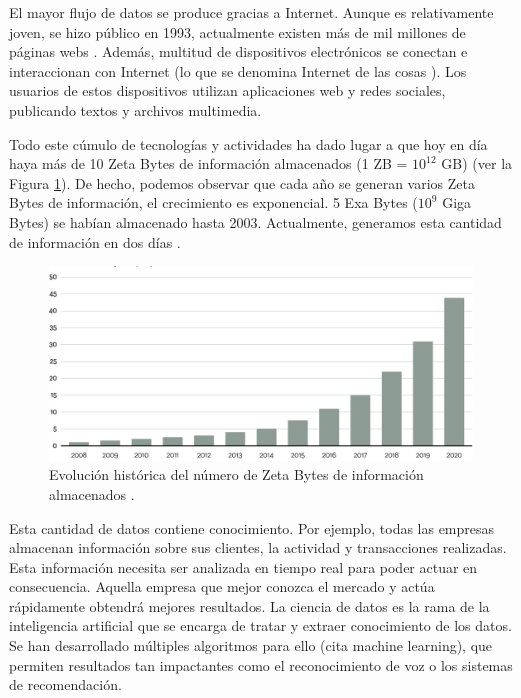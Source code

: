 \documentclass{article}
\begin{document}
	El mayor flujo de datos se produce gracias a Internet. Aunque es relativamente joven, se hizo público en 1993, actualmente existen más de mil millones de páginas webs \cite{internet}. Además, multitud de dispositivos electrónicos se conectan e interaccionan con Internet (lo que se denomina Internet de las cosas \cite{big-data-internet-cosas}). Los usuarios de estos dispositivos utilizan aplicaciones web y redes sociales, publicando textos y archivos multimedia. 
	
	Todo este cúmulo de tecnologías y actividades ha dado lugar a que hoy en día haya más de 10 Zeta Bytes de información almacenados (1 ZB = $10^{12}$ GB) (ver la Figura \ref{fig:zeta-bytes}). De hecho, podemos observar que cada año se generan varios Zeta Bytes de información, el crecimiento es exponencial. 5 Exa Bytes ($10^9$ Giga Bytes) se habían almacenado hasta 2003. Actualmente, generamos esta cantidad de información en dos días \cite{big-data}.
	
	 \begin{figure}[h]
	       	\centering
	       	\includegraphics[width=15cm]{./images/Data.png}
	       	\caption{Evolución histórica del número de Zeta Bytes de información almacenados \cite{zeta-bytes}.} 
	       	\label{fig:zeta-bytes}
	 \end{figure}

	Esta cantidad de datos contiene conocimiento. Por ejemplo, todas las empresas almacenan información sobre sus clientes, la actividad y transacciones realizadas. Esta información necesita ser analizada en tiempo real para poder actuar en consecuencia. Aquella empresa que mejor conozca el mercado y actúa rápidamente obtendrá mejores resultados. La ciencia de datos es la rama de la inteligencia artificial que se encarga de tratar y extraer conocimiento de los datos. Se han desarrollado múltiples algoritmos para ello (cita machine learning), que permiten resultados tan impactantes como el reconocimiento de voz o los sistemas de recomendación.
	
\end{document}
